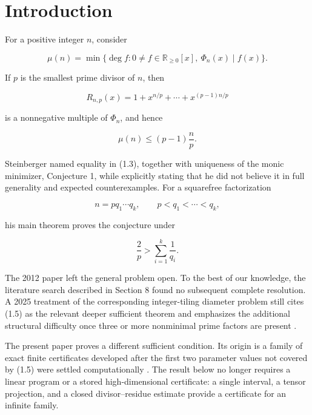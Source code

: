 \documentclass[11pt]{article}
\numberwithin{equation}{section}
\begin{document}
\section{Introduction}


For a positive integer \(n\), consider

\nopagebreak[4]
\[
\mu(n)=
\min\{\deg f:0\ne f\in\mathbb R_{\geq0}[x],\ \Phi_n(x)\mid f(x)\}.
\tag{1.1}
\]

If \(p\) is the smallest prime divisor of \(n\), then

\nopagebreak[4]
\[
R_{n,p}(x)=1+x^{n/p}+\cdots+x^{(p-1)n/p}
\tag{1.2}
\]

is a nonnegative multiple of \(\Phi_n\), and hence

\nopagebreak[4]
\[
\mu(n)\leq (p-1)\frac np.
\tag{1.3}
\]

Steinberger \cite{steinberger2012} named equality in (1.3), together with uniqueness of the
monic minimizer, Conjecture 1, while explicitly stating that he did not
believe it in full generality and expected counterexamples. For a squarefree
factorization

\nopagebreak[4]
\[
n=pq_1\cdots q_k,
\qquad p<q_1<\cdots<q_k,
\tag{1.4}
\]

his main theorem proves the conjecture under

\nopagebreak[4]
\[
\frac2p>\sum_{i=1}^k\frac1{q_i}.
\tag{1.5}
\]

The 2012 paper left the general problem open. To the best of our knowledge,
the literature search described in Section 8 found no subsequent complete
resolution. A 2025 treatment of the corresponding integer-tiling diameter
problem still cites (1.5) as the relevant deeper sufficient theorem and
emphasizes the additional structural difficulty once three or more
nonminimal prime factors are present \cite{labazakharov2025}.

The present paper proves a different sufficient condition. Its origin is a
family of exact finite certificates developed after the first two parameter
values not covered by (1.5) were settled computationally \cite{carptopus2026}. The result
below no longer requires a linear program or a stored high-dimensional
certificate: a single interval, a tensor projection, and a closed
divisor--residue estimate provide a certificate for an infinite family.
\end{document}
